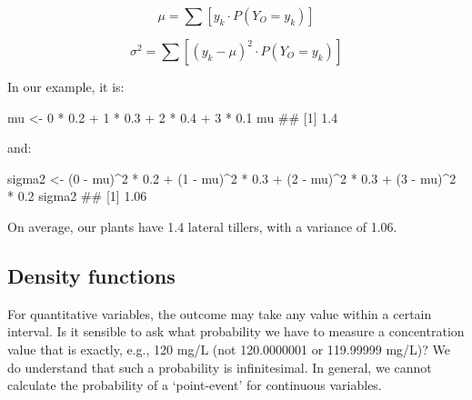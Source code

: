 \documentclass[a4paper,12pt,oneside]{book}
\newenvironment{Shaded}{\begin{snugshade}}{\end{snugshade}}
\newcommand{\DecValTok}[1]{#1}
\newcommand{\FloatTok}[1]{#1}
\newcommand{\SpecialCharTok}[1]{#1}
\newcommand{\DocumentationTok}[1]{#1}
\newcommand{\OtherTok}[1]{#1}
\newcommand{\NormalTok}[1]{#1}
\begin{document}
\[\mu  = \sum{\left[ y_k \cdot P(Y_O = y_k ) \right]}\]

\[\sigma ^2  = \sum{ \left[ {\left( {y_k  - \mu } \right)^2 \cdot P(Y_O = y_k)} \right]}\]

In our example, it is:

\begin{Shaded}
\begin{Highlighting}[]
\NormalTok{mu }\OtherTok{\textless{}{-}} \DecValTok{0} \SpecialCharTok{*} \FloatTok{0.2} \SpecialCharTok{+} \DecValTok{1} \SpecialCharTok{*} \FloatTok{0.3} \SpecialCharTok{+} \DecValTok{2} \SpecialCharTok{*} \FloatTok{0.4} \SpecialCharTok{+} \DecValTok{3} \SpecialCharTok{*} \FloatTok{0.1}
\NormalTok{mu}
\DocumentationTok{\#\# [1] 1.4}
\end{Highlighting}
\end{Shaded}

and:

\begin{Shaded}
\begin{Highlighting}[]
\NormalTok{sigma2 }\OtherTok{\textless{}{-}}\NormalTok{ (}\DecValTok{0} \SpecialCharTok{{-}}\NormalTok{ mu)}\SpecialCharTok{\^{}}\DecValTok{2} \SpecialCharTok{*} \FloatTok{0.2} \SpecialCharTok{+}\NormalTok{ (}\DecValTok{1} \SpecialCharTok{{-}}\NormalTok{ mu)}\SpecialCharTok{\^{}}\DecValTok{2} \SpecialCharTok{*} \FloatTok{0.3} \SpecialCharTok{+}\NormalTok{ (}\DecValTok{2} \SpecialCharTok{{-}}\NormalTok{ mu)}\SpecialCharTok{\^{}}\DecValTok{2} \SpecialCharTok{*} 
  \FloatTok{0.3} \SpecialCharTok{+}\NormalTok{ (}\DecValTok{3} \SpecialCharTok{{-}}\NormalTok{ mu)}\SpecialCharTok{\^{}}\DecValTok{2} \SpecialCharTok{*} \FloatTok{0.2}
\NormalTok{sigma2  }
\DocumentationTok{\#\# [1] 1.06}
\end{Highlighting}
\end{Shaded}

On average, our plants have 1.4 lateral tillers, with a variance of 1.06.

\hypertarget{density-functions}{%
\subsection{Density functions}\label{density-functions}}

For quantitative variables, the outcome may take any value within a certain interval. Is it sensible to ask what probability we have to measure a concentration value that is exactly, e.g., 120 mg/L (not 120.0000001 or 119.99999 mg/L)? We do understand that such a probability is infinitesimal. In general, we cannot calculate the probability of a `point-event' for continuous variables.
\end{document}
